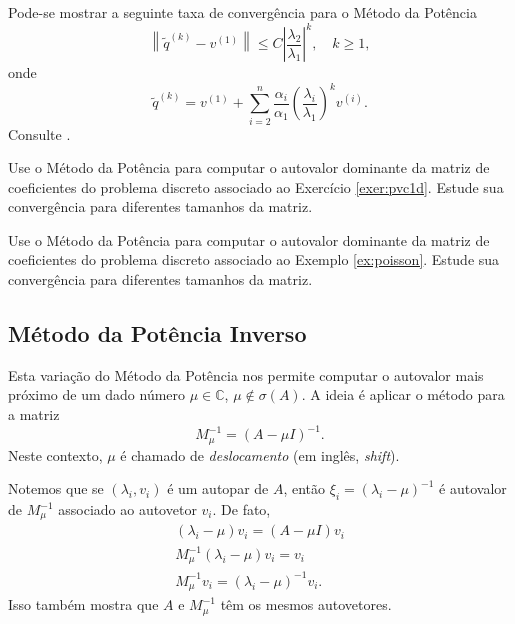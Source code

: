 \begin{obs}
  Pode-se mostrar a seguinte taxa de convergência para o Método da Potência
  \begin{equation}
    \left\|\tilde{q}^{(k)}-v^{(1)}\right\| \leq C\left|\frac{\lambda_2}{\lambda_1}\right|^k,\quad k\geq 1,
  \end{equation}
  onde
  \begin{equation}
    \tilde{q}^{(k)} = v^{(1)} + \sum_{i=2}^n \frac{\alpha_i}{\alpha_1}\left(\frac{\lambda_i}{\lambda_1}\right)^kv^{(i)}.
  \end{equation}
  Consulte \cite[Seção 5.3.]{Quarteroni2007a}.
\end{obs}



\begin{exer}
  Use o Método da Potência para computar o autovalor dominante da matriz de coeficientes do problema discreto associado ao Exercício \ref{exer:pvc1d}. Estude sua convergência para diferentes tamanhos da matriz. 
\end{exer}

\begin{exer}
  Use o Método da Potência para computar o autovalor dominante da matriz de coeficientes do problema discreto associado ao Exemplo \ref{ex:poisson}. Estude sua convergência para diferentes tamanhos da matriz. 
\end{exer}

\subsection{Método da Potência Inverso}

Esta variação do Método da Potência nos permite computar o autovalor mais próximo de um dado número $\mu\in\mathbb{C}$, $\mu\not\in\sigma(A)$. A ideia é aplicar o método para a matriz
\begin{equation}
  M_\mu^{-1} = (A-\mu I)^{-1}.
\end{equation}
Neste contexto, $\mu$ é chamado de \emph{deslocamento} (em inglês, {\it shift}).

Notemos que se $(\lambda_i, v_i)$ é um autopar de $A$, então $\xi_i=(\lambda_i-\mu)^{-1}$ é autovalor de $M_\mu^{-1}$ associado ao autovetor $v_i$. De fato,
\begin{gather}
  (\lambda_i - \mu) v_i = (A-\mu I)v_i\\
  M_\mu^{-1}(\lambda_i-\mu)v_i = v_i\\
  M_\mu^{-1}v_i = (\lambda_i-\mu)^{-1}v_i.
\end{gather}
Isso também mostra que $A$ e $M_\mu^{-1}$ têm os mesmos autovetores.

